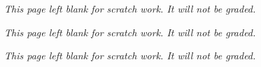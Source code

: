 \documentclass{article}
\begin{document}
\begin{enumerate}
   


\end{enumerate}

\emph{This page left blank for scratch work. It will not be graded.}

\newpage



\emph{This page left blank for scratch work. It will not be graded.}

\newpage



\emph{This page left blank for scratch work. It will not be graded.}
\end{document}
